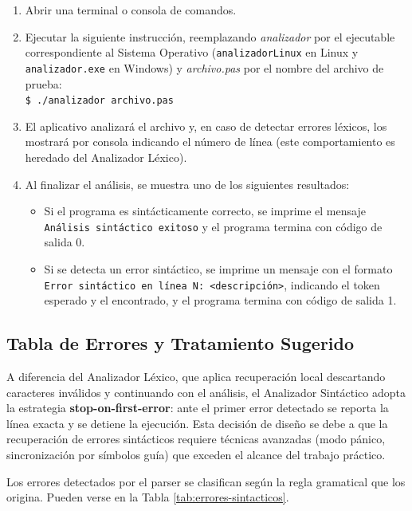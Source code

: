 \documentclass[12pt]{article}
\begin{document}
\begin{enumerate}
    \item Abrir una terminal o consola de comandos.
    \item Ejecutar la siguiente instrucción, reemplazando \textit{analizador} por el ejecutable correspondiente al Sistema Operativo (\texttt{analizadorLinux} en Linux y \texttt{analizador.exe} en Windows) y \textit{archivo.pas} por el nombre del archivo de prueba:\\
    \verb|$ ./analizador archivo.pas|
    \item El aplicativo analizará el archivo y, en caso de detectar errores léxicos, los mostrará por consola indicando el número de línea (este comportamiento es heredado del Analizador Léxico).
    \item Al finalizar el análisis, se muestra uno de los siguientes resultados:
    \begin{itemize}
        \item Si el programa es sintácticamente correcto, se imprime el mensaje \texttt{Análisis sintáctico exitoso} y el programa termina con código de salida 0.
        \item Si se detecta un error sintáctico, se imprime un mensaje con el formato \texttt{Error sintáctico en línea N: <descripción>}, indicando el token esperado y el encontrado, y el programa termina con código de salida 1.
    \end{itemize}
\end{enumerate}

\subsection{Tabla de Errores y Tratamiento Sugerido}

A diferencia del Analizador Léxico, que aplica recuperación local descartando caracteres inválidos y continuando con el análisis, el Analizador Sintáctico adopta la estrategia \textbf{stop-on-first-error}: ante el primer error detectado se reporta la línea exacta y se detiene la ejecución. Esta decisión de diseño se debe a que la recuperación de errores sintácticos requiere técnicas avanzadas (modo pánico, sincronización por símbolos guía) que exceden el alcance del trabajo práctico.

Los errores detectados por el parser se clasifican según la regla gramatical que los origina. Pueden verse en la Tabla \ref{tab:errores-sintacticos}.
\end{document}
